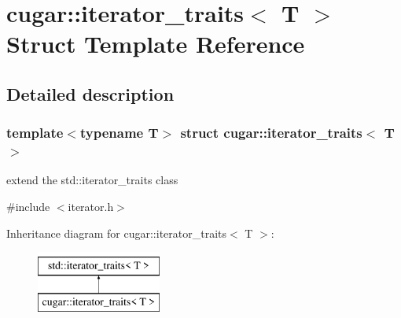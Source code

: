 \hypertarget{structcugar_1_1iterator__traits}{}\section{cugar\+:\+:iterator\+\_\+traits$<$ T $>$ Struct Template Reference}
\label{structcugar_1_1iterator__traits}


\subsection{Detailed description}
\subsubsection*{template$<$typename T$>$\newline
struct cugar\+::iterator\+\_\+traits$<$ T $>$}

extend the std\+::iterator\+\_\+traits class 

{\ttfamily \#include $<$iterator.\+h$>$}

Inheritance diagram for cugar\+:\+:iterator\+\_\+traits$<$ T $>$\+:\begin{figure}[H]
\begin{center}
\leavevmode
\includegraphics[height=2.000000cm]{structcugar_1_1iterator__traits}
\end{center}
\end{figure}
